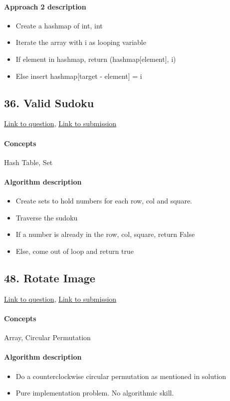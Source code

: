 \documentclass[11pt]{book}
\begin{document}
\paragraph{Approach 2 description}
\begin{itemize}
    \item Create a hashmap of int, int
    \item Iterate the array with i as looping variable
    \item If element in hashmap, return (hashmap[element], i)
    \item Else insert hashmap[target - element] = i
\end{itemize}

\subsection{36. Valid Sudoku}
\href{https://leetcode.com/problems/valid-sudoku/}{Link to question},
\href{https://leetcode.com/submissions/detail/333176948/}{Link to submission}
\paragraph{Concepts}
Hash Table, Set
\paragraph{Algorithm description}
\begin{itemize}
    \item Create sets to hold numbers for each row, col and square.
    \item Traverse the sudoku
    \item If a number is already in the row, col, square, return False
    \item Else, come out of loop and return true
\end{itemize}

\subsection{48. Rotate Image}
\href{https://leetcode.com/problems/rotate-image/}{Link to question},
\href{https://leetcode.com/submissions/detail/333188499/}{Link to submission}
\paragraph{Concepts}
Array, Circular Permutation
\paragraph{Algorithm description}
\begin{itemize}
    \item Do a counterclockwise circular permutation as mentioned in solution
    \item Pure implementation problem. No algorithmic skill.
\end{itemize}
\end{document}
